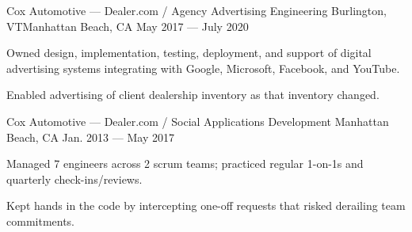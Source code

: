 \begin{cventries}
    {Cox Automotive --- Dealer.com / Agency Advertising Engineering} %
    {Burlington, VT{\vspace{1mm}\newline}Manhattan Beach, CA} %
    {May 2017 --- July 2020} %
    {%
      \begin{cvitems}
        \item {Owned design, implementation, testing, deployment, and support of digital advertising systems integrating with Google, Microsoft, Facebook, and YouTube.}
        \item {Enabled advertising of client dealership inventory as that inventory changed.}
      \end{cvitems}
    }

    {Cox Automotive --- Dealer.com / Social Applications Development} %
    {Manhattan Beach, CA} %
    {Jan. 2013 --- May 2017} %
    {%
      \begin{cvitems}
        \item {Managed 7 engineers across 2 scrum teams; practiced regular 1-on-1s and quarterly check-ins/reviews.}
        \item {Kept hands in the code by intercepting one-off requests that risked derailing team commitments.}
      \end{cvitems}
    }

\end{cventries}



